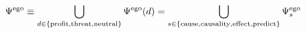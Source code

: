 \begin{equation}
    \Psi^{\mathrm{ego}} \equiv \bigcup_{d \in \{\mathrm{profit}, \mathrm{threat}, \mathrm{neutral}\}} \Psi^{\mathrm{ego}}(d) 
    = \bigcup_{s \in \{\mathrm{cause}, \mathrm{causality}, \mathrm{effect}, \mathrm{predict}\}} \Psi^{\mathrm{ego}}_s
\end{equation}


